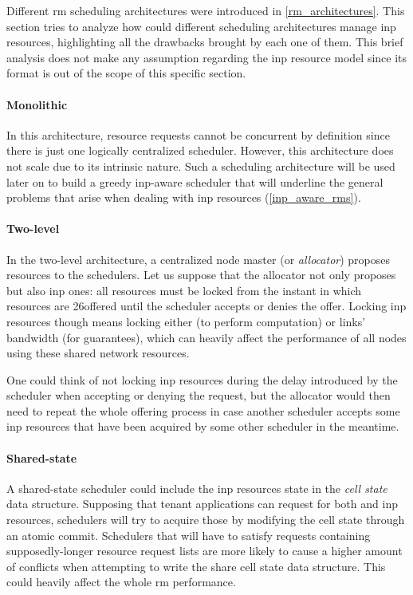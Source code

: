 Different \gls{rm} scheduling architectures were introduced in \autoref{rm_architectures}.
This section tries to analyze how could different scheduling architectures manage \gls{inp} resources, highlighting all the drawbacks brought by each one of them.
This brief analysis does not make any assumption regarding the \gls{inp} resource model since its format is out of the scope of this specific section.

\paragraph{Monolithic}
In this architecture, resource requests cannot be concurrent by definition since there is just one logically centralized scheduler.
However, this architecture does not scale due to its intrinsic nature.
Such a scheduling architecture will be used later on to build a greedy \gls{inp}-aware scheduler that will underline the general problems that arise when dealing with \gls{inp} resources (\autoref{inp_aware_rms}).

\paragraph{Two-level}
In the two-level architecture, a centralized node master (or \textit{allocator}) proposes resources to the schedulers.
Let us suppose that the allocator not only proposes  but also \gls{inp} ones: all resources must be locked from the instant in which resources are
26offered until the scheduler accepts or denies the offer.
Locking \gls{inp} resources though means locking either  (to perform computation) or links' bandwidth (for guarantees), which can heavily affect the performance of all nodes using these shared network resources.\par
One could think of not locking \gls{inp} resources during the delay introduced by the scheduler when accepting or denying the request, but the allocator would then need to repeat the whole offering process in case another scheduler accepts some \gls{inp} resources that have been acquired by some other scheduler in the meantime.

\paragraph{Shared-state}
A shared-state scheduler could include the \gls{inp} resources state in the \textit{cell state} data structure.
Supposing that tenant applications can request for both  and \gls{inp} resources, schedulers will try to acquire those by modifying the cell state through an atomic commit.
Schedulers that will have to satisfy requests containing supposedly-longer resource request lists are more likely to cause a higher amount of conflicts when attempting to write the share cell state data structure.
This could heavily affect the whole \gls{rm} performance.